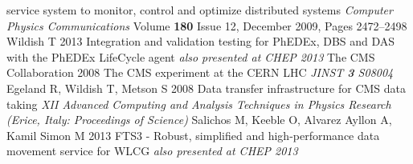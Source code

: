 \begin{thebibliography}{1}
service system to monitor, control and optimize distributed systems {\it
Computer Physics Communications} Volume {\bf180} Issue 12, December 2009,
Pages 2472–2498
    Wildish T 2013 Integration and validation testing for PhEDEx, DBS and DAS with the PhEDEx LifeCycle agent {\it also presented at CHEP 2013}
The CMS Collaboration 2008 The CMS experiment at the CERN LHC {\it JINST
{\bf 3} S08004}
    Egeland R, Wildish T, Metson S 2008 Data transfer infrastructure for CMS data taking {\it XII Advanced Computing and Analysis Techniques in Physics Research (Erice, Italy: Proceedings of Science)}
    Salichos M, Keeble O, Alvarez Ayllon A, Kamil Simon M 2013 FTS3 - Robust, simplified and high-performance data movement service for WLCG {\it also presented at CHEP 2013}
\end{thebibliography}
